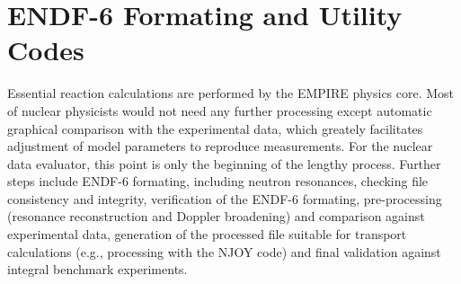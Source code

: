 \documentclass[twocolumn,amsmath,amssymb,10pt,groupedaddress,a4paper]{revtex4}
\begin{document}
\section{ENDF-6 Formating and Utility Codes}
Essential reaction calculations are performed by the EMPIRE physics core. Most of nuclear physicists
would not need any further processing except automatic graphical comparison with the experimental data, which greately facilitates adjustment of model parameters to reproduce measurements. For the nuclear data evaluator, this point is only the beginning of the lengthy process. Further steps include ENDF-6 formating, including neutron resonances, checking file consistency and integrity, verification of the ENDF-6 formating, pre-processing  (resonance reconstruction and Doppler broadening) and comparison against experimental data, generation of the processed file suitable for transport calculations (e.g., processing with the NJOY code) and final validation against integral benchmark experiments.
\end{document}

